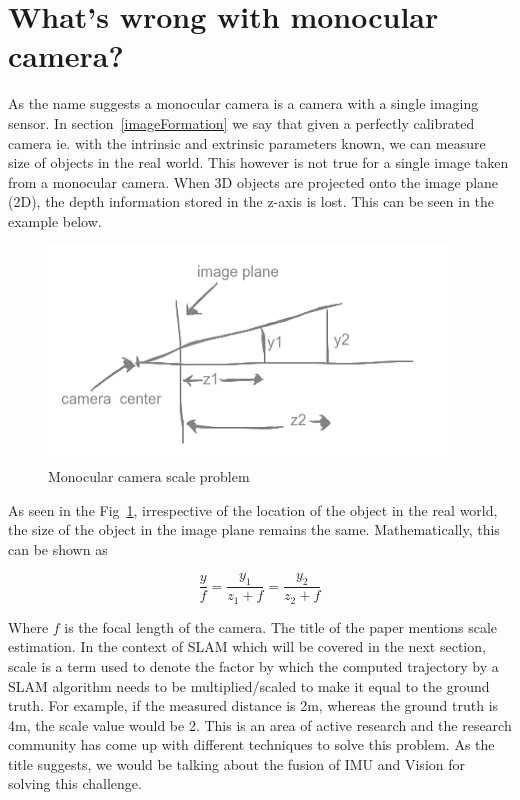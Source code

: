 \section{What's wrong with monocular camera?}
\label{mono_prob}

As the name suggests a monocular camera is a camera with a single imaging sensor. In section~\ref{imageFormation} we say that given a perfectly calibrated camera ie. with the intrinsic and extrinsic parameters known, we can measure size of objects in the real world. This however is not true for a single image taken from a monocular camera. When 3D objects are projected onto the image plane (2D), the depth information stored in the z-axis is lost. This can be seen in the example below. 

\begin{figure}
  \includegraphics[width=\textwidth]{./figures/1.png}
\caption{Monocular camera scale problem}
\label{fig:mono1}       %
\end{figure}

As seen in the Fig~\ref{fig:mono1}, irrespective of the location of the object in the real world, the size of the object in the image plane remains the same. Mathematically, this can be shown as 

\begin{equation}
\frac{y}{f}=\frac{y_1}{z_1+f}=\frac{y_2}{z_2+f}
\end{equation}

Where $f$ is the focal length of the camera. The title of the paper mentions scale estimation. In the context of SLAM which will be covered in the next section, scale is a term used to denote the factor by which the computed trajectory by a SLAM algorithm needs to be multiplied/scaled to make it equal to the ground truth. For example, if the measured distance is 2m, whereas the ground truth is 4m, the scale value would be 2. This is an area of active research and the research community has come up with different techniques to solve this problem. As the title suggests, we would be talking about the fusion of IMU and Vision for solving this challenge.
